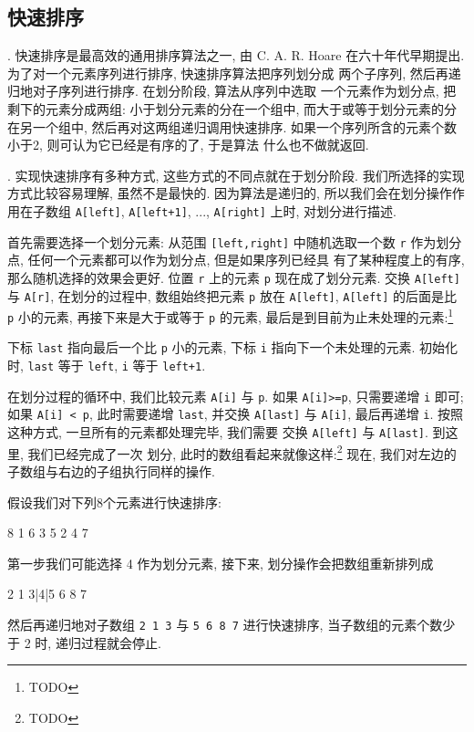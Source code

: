 \subsection{快速排序}
\label{subsec:quicksort}

. 快速排序是最高效的通用排序算法之一, 由 C. A. R. Hoare
在六十年代早期提出. 为了对一个元素序列进行排序, 快速排序算法把序列划分成
两个子序列, 然后再递归地对子序列进行排序. 在划分阶段, 算法从序列中选取
一个元素作为划分点, 把剩下的元素分成两组: 小于划分元素的分在一个组中, 
而大于或等于划分元素的分在另一个组中, 然后再对这两组递归调用快速排序.
如果一个序列所含的元素个数小于2, 则可认为它已经是有序的了, 于是算法
什么也不做就返回.

. 实现快速排序有多种方式, 这些方式的不同点就在于划分阶段.
我们所选择的实现方式比较容易理解, 虽然不是最快的. 因为算法是递归的,
所以我们会在划分操作作用在子数组 \texttt{A[left]}, \texttt{A[left+1]},
..., \texttt{A[right]} 上时, 对划分进行描述.

首先需要选择一个划分元素: 从范围 \texttt{[left,right]} 中随机选取一个数
\texttt{r} 作为划分点, 任何一个元素都可以作为划分点, 但是如果序列已经具
有了某种程度上的有序, 那么随机选择的效果会更好. 位置 \texttt{r} 上的元素
\texttt{p} 现在成了划分元素. 交换 \texttt{A[left]} 与 \texttt{A[r]},
在划分的过程中, 数组始终把元素 \texttt{p} 放在 \texttt{A[left]}, 
\texttt{A[left]} 的后面是比 \texttt{p} 小的元素, 再接下来是大于或等于
\texttt{p} 的元素, 最后是到目前为止未处理的元素:\footnote{TODO}

下标 \texttt{last} 指向最后一个比 \texttt{p} 小的元素, 下标 \texttt{i}
指向下一个未处理的元素. 初始化时, \texttt{last} 等于 \texttt{left},
\texttt{i} 等于 \texttt{left+1}.

在划分过程的循环中, 我们比较元素 \texttt{A[i]} 与 \texttt{p}. 如果 
\texttt{A[i]>=p}, 只需要递增 \texttt{i} 即可; 如果 \texttt{A[i] < p},
此时需要递增 \texttt{last}, 并交换 \texttt{A[last]} 与 \texttt{A[i]},
最后再递增 \texttt{i}. 按照这种方式, 一旦所有的元素都处理完毕, 我们需要
交换 \texttt{A[left]} 与 \texttt{A[last]}. 到这里, 我们已经完成了一次
划分, 此时的数组看起来就像这样:\footnote{TODO}
现在, 我们对左边的子数组与右边的子组执行同样的操作.

假设我们对下列8个元素进行快速排序:
\begin{file}
    8 1 6 3 5 2 4 7
\end{file}
第一步我们可能选择 4 作为划分元素, 接下来, 划分操作会把数组重新排列成
\begin{file}
    2 1 3|4|5 6 8 7
\end{file}
然后再递归地对子数组 \texttt{2 1 3} 与 \texttt{5 6 8 7} 进行快速排序,
当子数组的元素个数少于 2 时, 递归过程就会停止.

